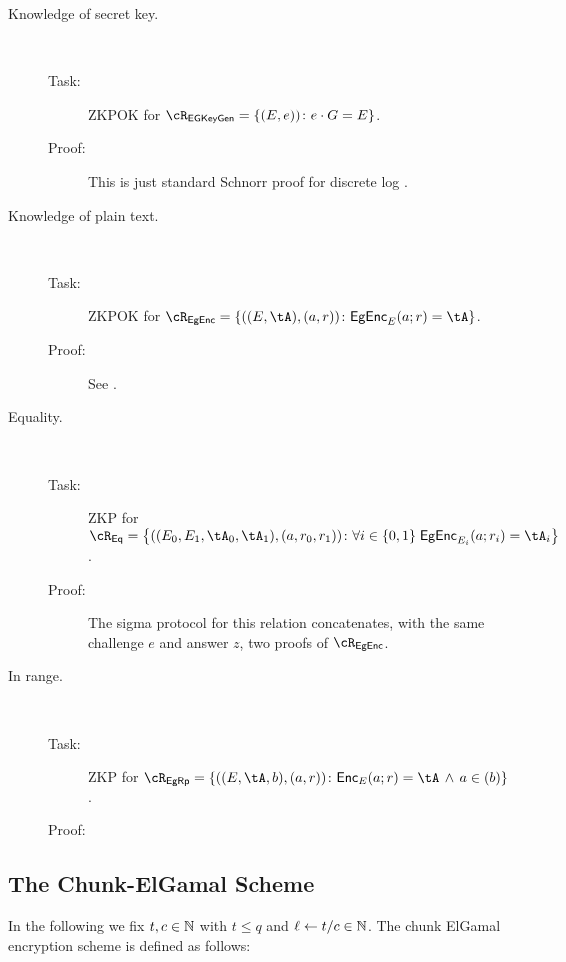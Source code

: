 	
\begin{description}
	\item[Knowledge of secret key.] ~
    


\begin{description}
	\item[Task:] ZKPOK for $\rEgKeyGen = \rEgKeyGenDef$.
	
\item[Proof:] This is just standard Schnorr proof for discrete log \cite{Shoup00b}.
\end{description}


\item[Knowledge of plain text.] ~

\begin{description}
	\item[Task:] ZKPOK for $\rEGEnc=\rEGEncDef$.
	
	\item[Proof:] See  \cite[Protocol A.2]{HaitnerLNR23}.
	
\end{description}


\item[Equality.] ~
\begin{description}
	\item[Task:] ZKP for $\rEgEq =\rEgEqDef$.
	
	\item[Proof:] The sigma protocol for this relation concatenates, with the same challenge $e$ and answer $z$, two proofs of $\rEGEnc$. 
\end{description}


\item[In range.] ~
\begin{description}
	\item[Task:] ZKP for $\rEgRp =\rEgRpDef$.
	
	\item[Proof:] 
\end{description}



\end{description}

	
\subsection{The Chunk-ElGamal  Scheme}\label{sec:ChanksEG:EGScheme}
In the following we fix $t,c\in {\mathbb{N}}$ with $t\le q$ and $\ell \leftarrow t/c \in {\mathbb{N}}$. The chunk ElGamal encryption scheme  is defined as follows:


